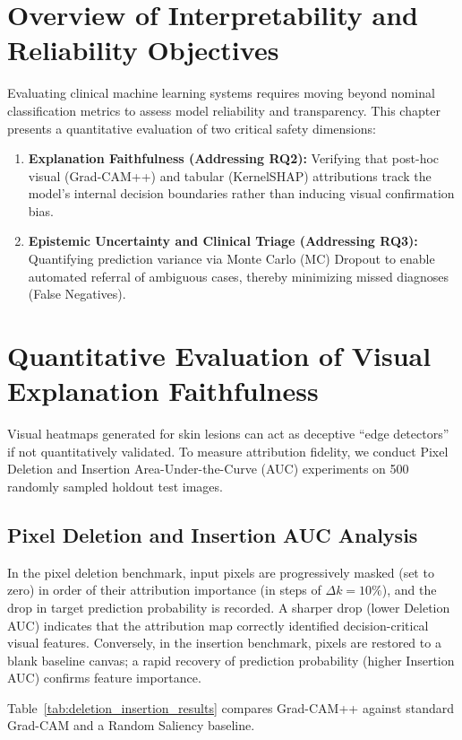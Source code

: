 \documentclass[12pt,a4paper]{report}
\begin{document}
	\section{Overview of Interpretability and Reliability Objectives}
	Evaluating clinical machine learning systems requires moving beyond nominal classification metrics to assess model reliability and transparency. This chapter presents a quantitative evaluation of two critical safety dimensions:
	\begin{enumerate}
		\item \textbf{Explanation Faithfulness (Addressing RQ2):} Verifying that post-hoc visual (Grad-CAM++) and tabular (KernelSHAP) attributions track the model's internal decision boundaries rather than inducing visual confirmation bias.
		\item \textbf{Epistemic Uncertainty and Clinical Triage (Addressing RQ3):} Quantifying prediction variance via Monte Carlo (MC) Dropout to enable automated referral of ambiguous cases, thereby minimizing missed diagnoses (False Negatives).
	\end{enumerate}
	
	\section{Quantitative Evaluation of Visual Explanation Faithfulness}
	Visual heatmaps generated for skin lesions can act as deceptive ``edge detectors'' if not quantitatively validated. To measure attribution fidelity, we conduct Pixel Deletion and Insertion Area-Under-the-Curve (AUC) experiments on 500 randomly sampled holdout test images.
	
	\subsection{Pixel Deletion and Insertion AUC Analysis}
	In the pixel deletion benchmark, input pixels are progressively masked (set to zero) in order of their attribution importance (in steps of $\Delta k = 10\%$), and the drop in target prediction probability is recorded. A sharper drop (lower Deletion AUC) indicates that the attribution map correctly identified decision-critical visual features. Conversely, in the insertion benchmark, pixels are restored to a blank baseline canvas; a rapid recovery of prediction probability (higher Insertion AUC) confirms feature importance.
	
	Table~\ref{tab:deletion_insertion_results} compares Grad-CAM++ against standard Grad-CAM and a Random Saliency baseline.
	
\end{document}
